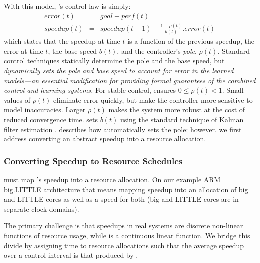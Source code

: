 With this model, \SYSTEM{}'s control law is simply:
\begin{eqnarray}
  error(t) &=& goal - perf(t) \label{eqn:speedup-error} \\
  speedup(t) &=& speedup(t-1) - \frac{1 - \rho(t)}{b(t)}.error(t)
  \label{eqn:speedup-control}
\end{eqnarray}
which states that the speedup at time $t$ is a function of the
previous speedup, the error at time $t$, the base speed $b(t)$, and
the controller's \emph{pole}, $\rho(t)$.  Standard control techniques
statically determine the pole and the base speed, but \SYSTEM{}
\emph{dynamically sets the pole and base speed to account for error in
  the learned models---an essential modification for providing formal
  guarantees of the combined control and learning systems.}  For
stable control, \SYSTEM{} ensures $0 \le \rho(t) < 1$. Small values of
$\rho(t)$ eliminate error quickly, but make the controller more
sensitive to model inaccuracies.  Larger $\rho(t)$ makes the system
more robust at the cost of reduced convergence time.  \SYSTEM{} sets
$b(t)$ using the standard technique of Kalman filter estimation
\cite{welch2006kalman}.  describes how \SYSTEM{}
automatically sets the pole; however, we first address converting an
abstract speedup into a resource allocation.

\subsubsection{Converting Speedup to Resource Schedules}
\SYSTEM{} must map 's speedup into a resource
allocation.  On our example ARM big.LITTLE architecture that means
mapping speedup into an allocation of big and LITTLE cores as well as
a speed for both (big and LITTLE cores are in separate clock domains).

The primary challenge is that speedups in real systems are discrete
non-linear functions of resource usage, while 
is a continuous linear function.  We bridge this divide by assigning
time to resource allocations such that the average speedup over a
control interval is that produced by .

